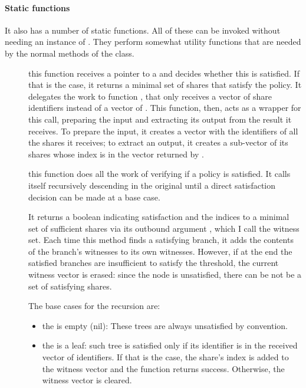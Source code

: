 \documentclass{article}
\begin{document}
\paragraph{Static functions}
It also has a number of static functions. All of these can be invoked without needing an instance of \cShTreeAP. They perform somewhat utility functions that are needed by the normal methods of the class.

\begin{description}
\item[] this function receives a pointer to a \ctree and decides whether this is satisfied. If that is the case, it returns a minimal set of shares that satisfy the policy. It delegates the work to function , that only receives a vector of share identifiers instead of a vector of \cST. This function, then, acts as a wrapper for this call, preparing the input and extracting its output from the result it receives. To prepare the input, it creates a vector with the identifiers of all the shares it receives; to extract an output, it creates a sub-vector of its shares whose index is in the vector returned by .

\item[] this function does all the work of verifying if a policy is satisfied. It calls itself recursively descending in the original \ctree until a direct satisfaction decision can be made at a base case.

It returns a boolean indicating satisfaction and the indices to a minimal set of sufficient shares via its outbound argument , which I call the witness set. Each time this method finds a satisfying branch, it adds the contents of the branch's witnesses to its own witnesses. However, if at the end the satisfied branches are insufficient to satisfy the threshold, the current witness vector is erased: since the node is unsatisfied, there can be not be a set of satisfying shares.

The base cases for the recursion are:
\begin{itemize}
\item the \ctree is empty (nil): These trees are always unsatisfied by convention.
\item the \ctree is a leaf: such tree is satisfied only if its identifier is in the received vector of identifiers. If that is the case, the share's index is added to the witness vector  and the function returns success. Otherwise, the witness vector is cleared.
\end{itemize}


\end{description}
\end{document}
